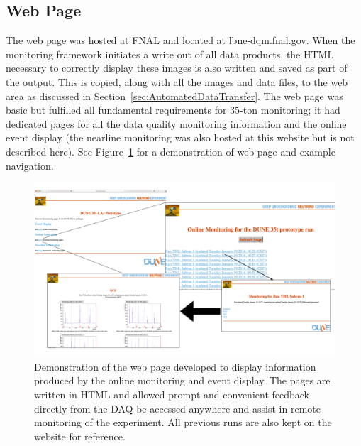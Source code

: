 \subsection{Web Page}\label{sec:WebPage}

The web page was hosted at FNAL and located at lbne-dqm.fnal.gov.  When the monitoring framework initiates a write out of all data products, the HTML necessary to correctly display these images is also written and saved as part of the output.  This is copied, along with all the images and data files, to the web area as discussed in Section~\ref{sec:AutomatedDataTransfer}.  The web page was basic but fulfilled all fundamental requirements for 35-ton monitoring; it had dedicated pages for all the data quality monitoring information and the online event display (the nearline monitoring was also hosted at this website but is not described here).  See Figure~\ref{fig:WebPage} for a demonstration of web page and example navigation.

\begin{figure}
  \centering
  \includegraphics[width=14cm]{webPage.png}
  \caption[Demonstration of the web page developed to display information produced by the online monitoring and event display.]{Demonstration of the web page developed to display information produced by the online monitoring and event display.  The pages are written in HTML and allowed prompt and convenient feedback directly from the DAQ be accessed anywhere and assist in remote monitoring of the experiment.  All previous runs are also kept on the website for reference.}
  \label{fig:WebPage}
\end{figure}

